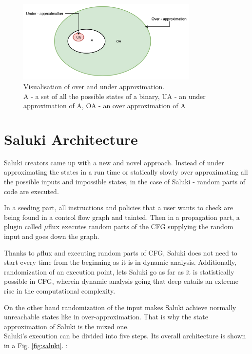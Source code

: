 \documentclass[a4paper, 12pt, journal, onecolumn]{IEEEtran}
\begin{document}
\begin{figure}[ht]
    \centering
    \captionsetup{justification=centering}
    \includegraphics[width=0.8\textwidth]{approximation.png}
    \caption{Visualisation of over and under approximation. \\ A - a set of all the possible states of a binary, UA - an under approximation of A, OA - an over approximation of A \cite{a3} }
    \label{fig:approximation}
\end{figure}

\pagebreak

\section{Saluki Architecture}

Saluki creators came up with a new and novel approach. Instead of under approximating the states in a run time or statically slowly over approximating all the possible inputs and impossible states, in the case of Saluki - random parts of code are executed. 

In a seeding part, all instructions and policies that a user wants to check are being found in a control flow graph and tainted. Then in a propagation part, a plugin called $\mu$flux executes random parts of the CFG supplying the random input and goes down the graph. 

Thanks to $\mu$flux and executing random parts of CFG, Saluki does not need to start every time from the beginning as it is in dynamic analysis. Additionally, randomization of an execution point, lets Saluki go as far as it is statistically possible in CFG, wherein dynamic analysis going that deep entails an extreme rise in the computational complexity. 

On the other hand randomization of the input makes Saluki achieve normally unreachable states like in over-approximation. That is why the state approximation of Saluki is the mixed one.\cite{a4}
\\

Saluki's execution can be divided into five steps.
Its overall architecture is shown in a Fig. \ref{fig:saluki}.  \cite{saluki} :
\end{document}
